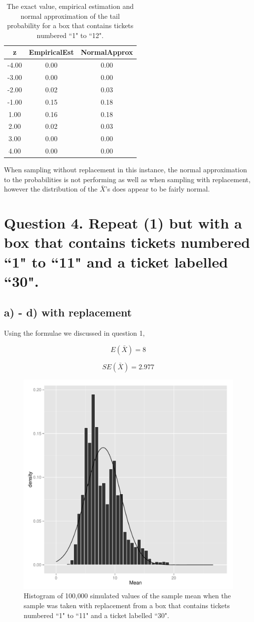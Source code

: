 \documentclass[11pt]{article}
\begin{document}
\begin{table}[H]
\centering
\begin{tabular}{|c|cc|}
  \hline
z & EmpiricalEst & NormalApprox \\ 
  \hline
-4.00 & 0.00 & 0.00 \\ 
  -3.00 & 0.00 & 0.00 \\ 
  -2.00 & 0.02 & 0.03 \\ 
  -1.00 & 0.15 & 0.18 \\ 
  1.00 & 0.16 & 0.18 \\ 
  2.00 & 0.02 & 0.03 \\ 
  3.00 & 0.00 & 0.00 \\ 
  4.00 & 0.00 & 0.00 \\ 
   \hline
\end{tabular}
\caption{The exact value, empirical estimation and normal approximation of the tail probability for a box that contains tickets numbered ``1" to ``12".} 
\end{table}


\noindent When sampling without replacement in this instance, the normal approximation to the probabilities is not performing as well as when sampling with replacement, however the distribution of the $\bar{X}$'s does appear to be fairly normal.


\pagebreak

 \section*{Question 4. Repeat (1) but with a box that contains tickets numbered ``1" to ``11" and a ticket labelled ``30".}
 
 \subsection*{a) - d) with replacement}
Using the formulae we discussed in question 1,

$$E(\bar{X})= 8$$ 
 
 $$SE(\bar{X}) = 2.977$$

 
\begin{figure}[H]
\centering
\includegraphics[width = .5\textwidth]{histogram_4c-1.pdf}
\caption{Histogram of 100,000 simulated values of the sample mean when the sample was taken with replacement from a box that contains tickets numbered ``1" to ``11" and a ticket labelled ``30".}\label{fig:q4c}
\end{figure}
 
\end{document}
